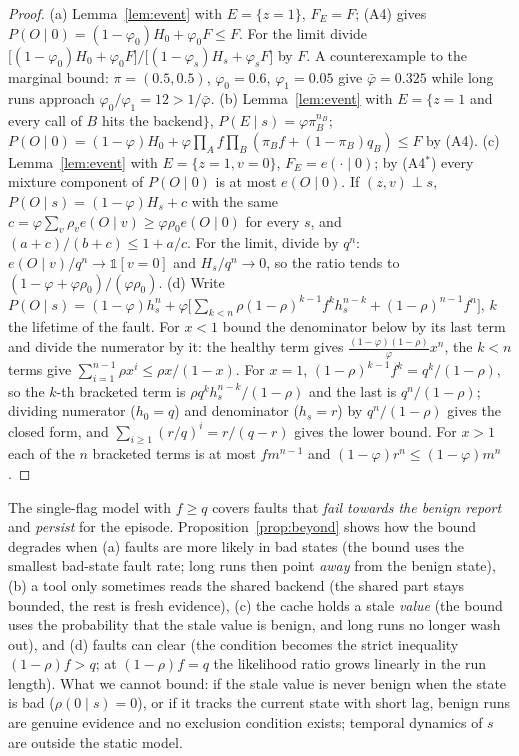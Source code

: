\begin{proof}
(a) Lemma~\ref{lem:event} with $E=\{z=1\}$, $F_E=F$; (A4) gives $P(O\mid0)=(1-\varphi_0)H_0+\varphi_0F\le F$. For the
limit divide $\big[(1-\varphi_0)H_0+\varphi_0F\big]/\big[(1-\varphi_s)H_s+\varphi_sF\big]$ by $F$.
A counterexample to the marginal bound: $\pi=(0.5,0.5)$, $\varphi_0=0.6$, $\varphi_1=0.05$ give $\bar\varphi=0.325$ while
long runs approach $\varphi_0/\varphi_1=12>1/\bar\varphi$.
(b) Lemma~\ref{lem:event} with $E=\{z=1$ and every call of $B$ hits the backend$\}$, $P(E\mid s)=\varphi\pi_B^{n_B}$;
$P(O\mid0)=(1-\varphi)H_0+\varphi\prod_A f\prod_B(\pi_Bf+(1-\pi_B)q_B)\le F$ by (A4).
(c) Lemma~\ref{lem:event} with $E=\{z=1,v=0\}$, $F_E=e(\cdot\mid0)$; by (A4$^*$) every mixture component of
$P(O\mid0)$ is at most $e(O\mid0)$. If $(z,v)\perp s$, $P(O\mid s)=(1-\varphi)H_s+c$ with the same
$c=\varphi\sum_v\rho_ve(O\mid v)\ge\varphi\rho_0e(O\mid0)$ for every $s$, and $(a+c)/(b+c)\le1+a/c$. For the limit,
divide by $q^n$: $e(O\mid v)/q^n\to\mathbb 1[v=0]$ and $H_s/q^n\to0$, so the ratio tends to
$(1-\varphi+\varphi\rho_0)/(\varphi\rho_0)$.
(d) Write $P(O\mid s)=(1-\varphi)h_s^n+\varphi\big[\sum_{k<n}\rho(1-\rho)^{k-1}f^kh_s^{n-k}+(1-\rho)^{n-1}f^n\big]$, $k$ the
lifetime of the fault. For $x<1$ bound the denominator below by its last term and divide the numerator by it:
the healthy term gives $\frac{(1-\varphi)(1-\rho)}{\varphi}x^n$, the $k<n$ terms give $\sum_{i=1}^{n-1}\rho x^i\le\rho x/(1-x)$.
For $x=1$, $(1-\rho)^{k-1}f^k=q^k/(1-\rho)$, so the $k$-th bracketed term is $\rho q^kh_s^{n-k}/(1-\rho)$ and the last is
$q^n/(1-\rho)$; dividing numerator ($h_0=q$) and denominator ($h_s=r$) by $q^n/(1-\rho)$ gives the closed form, and
$\sum_{i\ge1}(r/q)^i=r/(q-r)$ gives the lower bound.
For $x>1$ each of the $n$ bracketed terms is at most $fm^{n-1}$ and $(1-\varphi)r^n\le(1-\varphi)m^n$.
\end{proof}

\begin{remark}
The single-flag model with $f\ge q$ covers faults that \emph{fail towards the benign report} and \emph{persist} for the
episode. Proposition~\ref{prop:beyond} shows how the bound degrades when (a) faults are more likely in bad states
(the bound uses the smallest bad-state fault rate; long runs then point \emph{away} from the benign state), (b) a tool
only sometimes reads the shared backend (the shared part stays bounded, the rest is fresh evidence),
(c) the cache holds a stale \emph{value} (the bound uses the probability that the stale value is benign, and long runs
no longer wash out), and (d) faults can clear (the condition becomes the strict inequality $(1-\rho)f>q$; at
$(1-\rho)f=q$ the likelihood ratio grows linearly in the run length). What we cannot bound: if the
stale value is never benign when the state is bad ($\rho(0\mid s)=0$), or if it tracks the current state with short
lag, benign runs are genuine evidence and no exclusion condition exists; temporal dynamics of $s$ are outside the
static model.
\end{remark}

